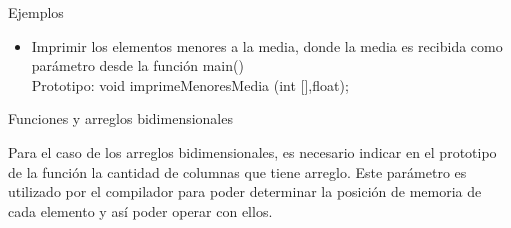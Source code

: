 \documentclass[xcolor=pdftex,table,11pt]{beamer}
\begin{document}
\begin{frame}[allowframebreaks]{Ejemplos}
\begin{enumerate}
\begin{itemize}
	  	 \item Imprimir los elementos menores a la media, donde la media es recibida como parámetro desde la función main()\\
	  Prototipo: void imprimeMenoresMedia (int [],float);
     \end{itemize}

\href{https://github.com/danis963/informaticaI_IUA/blob/main/c/src/5-break_cont_1.c}{}


   \end{enumerate}
   
\end{frame}



\begin{frame}[allowframebreaks]{Funciones y arreglos bidimensionales}


\begin{block}{}
Para el caso de los arreglos bidimensionales, es necesario indicar en el prototipo de la función la cantidad de columnas que tiene arreglo. Este parámetro es utilizado por el compilador para poder determinar la posición de memoria de cada elemento y así poder operar con ellos.


\end{block}

\codesetstylefrombeamer
{}
\href{https://github.com/danis963/informaticaI_IUA/blob/main/c/functions/func_array_2d.c}{}

\end{frame}
\end{document}
